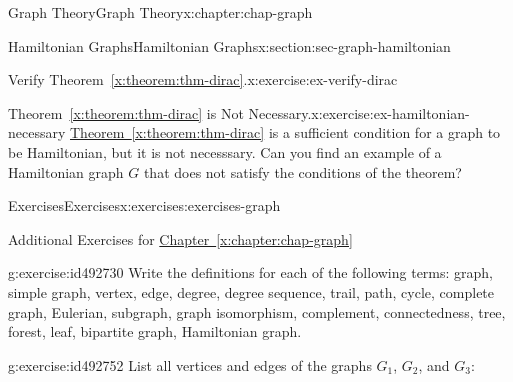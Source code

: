 \documentclass[oneside,10pt,]{book}
\newcommand{\xreffont}{\relax}
\numberwithin{equation}{section}
\begin{document}
\begin{chapterptx}{Graph Theory}{}{Graph Theory}{}{}{x:chapter:chap-graph}
\begin{sectionptx}{Hamiltonian Graphs}{}{Hamiltonian Graphs}{}{}{x:section:sec-graph-hamiltonian}
\begin{inlineexercise}{Verify Theorem~{\xreffont\ref*{x:theorem:thm-dirac}}.}{x:exercise:ex-verify-dirac}
\begin{sidebyside}{1}{0.325}{0.325}{0}
\begin{sbspanel}{0.35}
{
}%
\end{sbspanel}%
\end{sidebyside}%
\end{inlineexercise}
\begin{inlineexercise}{Theorem~{\xreffont\ref*{x:theorem:thm-dirac}} is Not Necessary.}{x:exercise:ex-hamiltonian-necessary}%
\hyperref[x:theorem:thm-dirac]{Theorem~{\xreffont\ref{x:theorem:thm-dirac}}} is a sufficient condition for a graph to be Hamiltonian, but it is not necesssary. Can you find an example of a Hamiltonian graph \(G\) that does not satisfy the conditions of the theorem?%
\end{inlineexercise}
\end{sectionptx}
%
%
\typeout{************************************************}
\typeout{************************************************}
%
\begin{exercises-section}{Exercises}{}{Exercises}{}{}{x:exercises:exercises-graph}
\begin{introduction}{}%
Additional Exercises for \hyperref[x:chapter:chap-graph]{Chapter~{\xreffont\ref{x:chapter:chap-graph}}}%
\end{introduction}%
\begin{divisionexercise}{1}{}{}{g:exercise:id492730}%
Write the definitions for each of the following terms: graph, simple graph, vertex, edge, degree, degree sequence, trail, path, cycle, complete graph, Eulerian, subgraph, graph isomorphism, complement, connectedness, tree, forest, leaf, bipartite graph, Hamiltonian graph.%
\end{divisionexercise}%
\begin{divisionexercise}{2}{}{}{g:exercise:id492752}%
List all vertices and edges of the graphs \(G_1\), \(G_2\), and \(G_3\):%
\begin{sidebyside}{3}{0.0516666666666667}{0.0516666666666667}{0.103333333333333}%

\end{sidebyside}
\end{divisionexercise}
\end{exercises-section}
\end{chapterptx}
\end{document}

